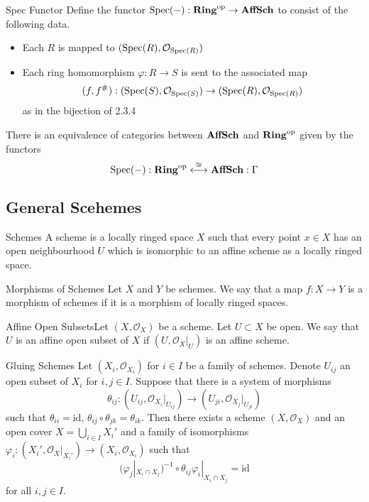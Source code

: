 \documentclass[a4paper]{article}
\begin{document}
\begin{defn}{Spec Functor}{} Define the functor $\text{Spec}(-):\bold{Ring}^\text{op}\to\bold{AffSch}$ to consist of the following data. 
\begin{itemize}
\item Each $R$ is mapped to $(\text{Spec}(R),\mathcal{O}_{\text{Spec}(R)})$
\item Each ring homomorphism $\varphi:R\to S$ is sent to the associated map $$(f,f^\#):(\text{Spec}(S),\mathcal{O}_{\text{Spec}(S)})\to(\text{Spec}(R),\mathcal{O}_{\text{Spec}(R)})$$ as in the bijection of 2.3.4
\end{itemize}
\end{defn}

\begin{prp}{}{} There is an equivalence of categories between $\bold{AffSch}$ and $\bold{Ring}^{\text{op}}$ given by the functors $$\text{Spec}(-):\bold{Ring}^\text{op}\overset{\cong}{\longleftrightarrow}\bold{AffSch}:\Gamma$$
\end{prp}

\subsection{General Scehemes}
\begin{defn}{Schemes}{} A scheme is a locally ringed space $X$ such that every point $x\in X$ has an open neighbourhood $U$ which is isomorphic to an affine scheme as a locally ringed space. 
\end{defn}

\begin{defn}{Morphisms of Schemes}{} Let $X$ and $Y$ be schemes. We say that a map $f:X\to Y$ is a morphism of schemes if it is a morphism of locally ringed spaces. 
\end{defn}

\begin{defn}{Affine Open Subsets}{}Let $(X,\mathcal{O}_X)$ be a scheme. Let $U\subset X$ be open.  We say that $U$ is an affine open subset of $X$ if $(U,\mathcal{O}_X|_U)$ is an affine scheme. 
\end{defn}

\begin{thm}{Gluing Schemes}{} Let $(X_i,\mathcal{O}_{X_i})$ for $i\in I$ be a family of schemes. Denote $U_{ij}$ an open subset of $X_i$ for $i,j\in I$. Suppose that there is a system of morphisms $$\theta_{ij}:(U_{ij},\mathcal{O}_{X_i}|_{U_{ij}})\to(U_{ji},\mathcal{O}_{X_j}|_{U_{ji}})$$ such that $\theta_{ii}=\text{id}$, $\theta_{ij}\circ\theta_{jk}=\theta_{ik}$. Then there exists a scheme $(X,\mathcal{O}_X)$ and an open cover $X=\bigcup_{i\in I}X_i'$ and a family of isomorphisms $\varphi_i:(X_i',\mathcal{O}_X|_{X_i'})\to(X_i,\mathcal{O}_{X_i})$ such that $$(\varphi_j|_{X_i\cap X_j})^{-1}\circ\theta_{ij}\varphi_i|_{X_i\cap X_j}=\text{id}$$ for all $i,j\in I$. 
\end{thm}
\end{document}
